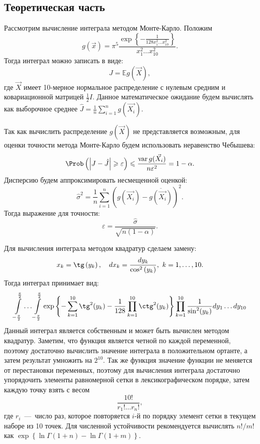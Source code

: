 \documentclass[12pt, a4paper]{article} %
\renewcommand{\le}{\leqslant}
\renewcommand{\ge}{\geqslant}
\renewcommand{\epsilon}{\varepsilon}
\def\Expec{\mathbb{E}} %
\DeclareMathOperator{\var}{var}
\begin{document}
\subsection{Теоретическая часть}

Рассмотрим вычисление интеграла методом Монте-Карло.
Положим 
\[
    g(\vec{x}) = \pi^{5} \frac{\exp \left\{ -\frac{1}{128 x_1^2 \ldots x_{10}^2} \right\}}{x_1^2 \ldots  x_{10}^2}.
\] 
Тогда интеграл можно записать в виде:
\[
    J = \Expec g(\vec{X}), 
\]
где $\vec{X}$ имеет 10-мерное нормальное распределение с нулевым средним и ковариационной матрицей $\frac{1}{2} I$.
Данное математическое ожидание будем вычислять как выборочное среднее 
$\hat{J} = \frac{1}{n} \sum\limits_{i=1}^{n} g(\vec{X_i})$.

Так как вычислить распределение $g(\vec{X})$ не представляется возможным, 
для оценки точности метода Монте-Карло будем использовать неравенство Чебышева:
\[
\Prob\left( \left\lvert J - \hat{J} \right\rvert \ge \epsilon \right) 
\le \frac{\var g(\vec{X_i})}{n\epsilon^2} = 1 - \alpha.
\]
Дисперсию будем аппроксимировать несмещенной оценкой:
$$\hat{\sigma}^2 = \frac{1}{n} \sum\limits_{i=1}^{n} \left( g(\vec{X_i}) - \overline{g(\vec{X_i})} \right)^2.$$
Тогда выражение для точности:
 \[
     \epsilon = \frac{\hat{\sigma}}{\sqrt{n(1 - \alpha)}}.
\] 

Для вычисления интеграла методом квадратур сделаем замену:
$$x_k = \tg\left(y_k\right), \quad dx_k = \dfrac{dy_k}{\cos^2\left(y_k\right)}, \ k = 1, \ldots, 10.$$
Тогда интеграл принимает вид:
$$\int\limits_{-\frac{\pi}{2}}^{\frac{\pi}{2}}\ldots\int\limits_{-\frac{\pi}{2}}^{\frac{\pi}{2}} \exp \left\{-\sum\limits_{k=1}^{10} \tg^2(y_k) - \dfrac{1}{128}\prod\limits_{k=1}^{10} \ctg^2 (y_k)\right\}\prod\limits_{k=1}^{10} \dfrac{1}{\sin^2(y_k)}dy_1\ldots dy_{10}$$
Данный интеграл является собственным и может быть вычислен методом квадратур.
Заметим, что функция является четной по каждой переменной, поэтому достаточно вычислить значение интеграла в положительном ортанте, а затем результат умножить на $2^{10}$.
Так же функция значение функции не меняется от перестановки переменных, поэтому для вычисления интеграла достаточно упорядочить элементы равномерной сетки в лексикографическом порядке,
затем каждую точку взять с весом 
\[
    \frac{10!}{r_1! \ldots r_{n}!},
\]
где $r_i$~---~число раз, которое повторяется  $i$-й по порядку элемент сетки в текущем наборе из 10 точек. 
Для численной устойчивости рекомендуется вычислять $n! / m!$ как $\exp\left\{\ln \Gamma (1 + n) - \ln \Gamma (1 + m)\right\}$. 
\end{document}
